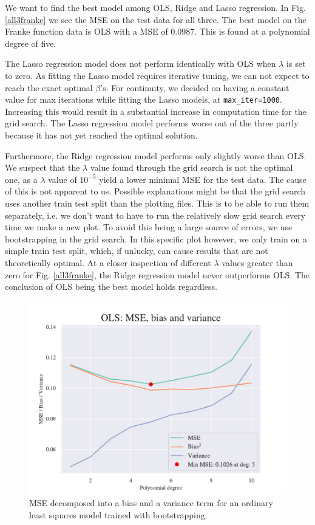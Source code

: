 We want to find the best model among OLS, Ridge and Lasso regression. 
In Fig. \ref{all3franke} we see the MSE on the test data for all three. 
The best model on the Franke function data is OLS with a MSE of 0.0987. 
This is found at a polynomial degree of five.  

The Lasso regression model does not perform identically with OLS when $\lambda$ is set to zero. 
As fitting the Lasso model requires iterative tuning, we can not expect to reach the exact optimal $\beta$'s. 
For continuity, we decided on having a constant value for max iterations while fitting the Lasso models, at \texttt{max\_iter=1000}. 
Increasing this would result in a substantial increase in computation time for the grid search.
The Lasso regression model performs worse out of the three partly because it has not yet reached the optimal solution.

Furthermore, the Ridge regression model performs only slightly worse than OLS.
We suspect that the $\lambda$ value found through the grid search is not the optimal one, as a $\lambda$ value of $10^{-5}$ yield a lower minimal MSE for the test data. 
The cause of this is not apparent to us. 
Possible explanations might be that the grid search uses another train test split than the plotting files. 
This is to be able to run them separately, i.e. we don't want to have to run the relatively slow grid search every time we make a new plot.
To avoid this being a large source of errors, we use bootstrapping in the grid search. 
In this specific plot however, we only train on a simple train test split, which, if unlucky, can cause results that are not theoretically optimal.
At a closer inspection of different $\lambda$ values greater than zero for Fig. \ref{all3franke}, the Ridge regression model never outperforms OLS. 
The conclusion of OLS being the best model holds regardless. 

\begin{figure}
    \centering
    \includegraphics[width=1\linewidth]{project_1/figures/figures_in_report/bias_var_Franke_Noise_bootstrap.pdf}
    \caption{MSE decomposed into a bias and a variance term for an ordinary least squares model trained with bootstrapping.
}
    \label{bias_var_trade}
\end{figure}

